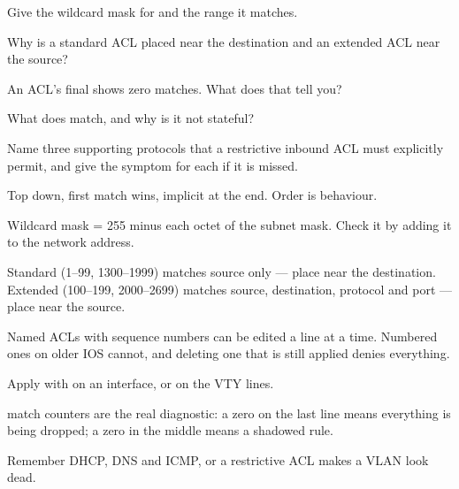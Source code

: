 \begin{checkpoint}
\begin{tightnum}
  \item Give the wildcard mask for  and the range it matches.
  \item Why is a standard ACL placed near the destination and an extended ACL
        near the source?
  \item An ACL's final  shows zero matches. What does that tell
        you?
  \item What does  match, and why is it not stateful?
  \item Name three supporting protocols that a restrictive inbound ACL must
        explicitly permit, and give the symptom for each if it is missed.
\end{tightnum}
\end{checkpoint}

\begin{chaptersummary}
\begin{tight}
  \item Top down, first match wins, implicit  at the end. Order is
        behaviour.
  \item Wildcard mask = 255 minus each octet of the subnet mask. Check it by
        adding it to the network address.
  \item Standard (1--99, 1300--1999) matches source only --- place near the
        destination. Extended (100--199, 2000--2699) matches source, destination,
        protocol and port --- place near the source.
  \item Named ACLs with sequence numbers can be edited a line at a time. Numbered
        ones on older IOS cannot, and deleting one that is still applied denies
        everything.
  \item Apply with  on an interface, or
         on the VTY lines.
  \item {} match counters are the real diagnostic: a zero on
        the last line means everything is being dropped; a zero in the middle
        means a shadowed rule.
  \item Remember DHCP, DNS and ICMP, or a restrictive ACL makes a VLAN look dead.
\end{tight}
\end{chaptersummary}

